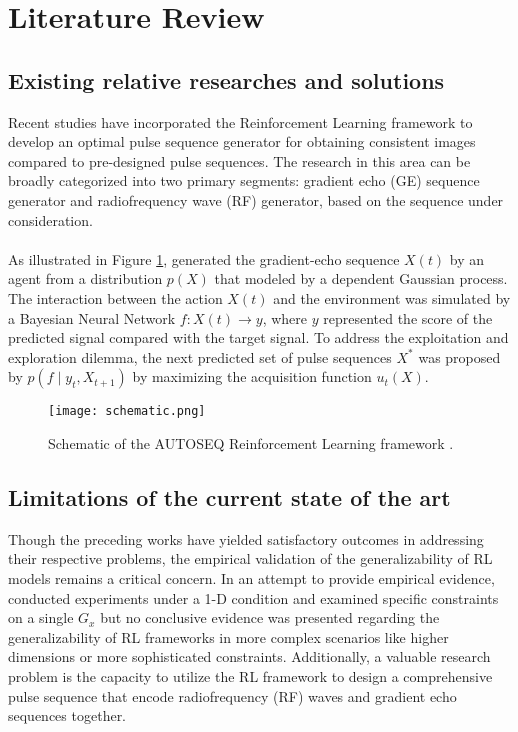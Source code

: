 \section{Literature Review}
\subsection{Existing relative researches and solutions}
Recent studies have incorporated the Reinforcement Learning framework to develop an optimal pulse sequence generator for obtaining consistent images compared to pre-designed pulse sequences. The research in this area can be broadly categorized into two primary segments: gradient echo (GE) sequence generator and radiofrequency wave (RF) generator, based on the sequence under consideration.
\\\\
As illustrated in Figure \ref{schematic}, \citet{0438} generated the gradient-echo sequence $X(t)$ by an agent from a distribution $p(X)$ that modeled by a dependent Gaussian process. The interaction between the action $X(t)$ and the environment was simulated by a Bayesian Neural Network $f:X(t) \rightarrow y$, where $y$ represented the score of the predicted signal compared with the target signal. To address the exploitation and exploration dilemma, the next predicted set of pulse sequences $X^*$ was proposed by $p\left(f \mid y_t, X_{t+1}\right)$ by maximizing the acquisition function $u_t(X)$.

\begin{figure}[ht]
    \centering
    \texttt{[image: schematic.png]}
    \caption{Schematic of the AUTOSEQ Reinforcement Learning framework \citep{0438}.}
    \label{schematic}
\end{figure}

\subsection{Limitations of the current state of the art}
Though the preceding works have yielded satisfactory outcomes in addressing their respective problems, the empirical validation of the generalizability of RL models remains a critical concern. In an attempt to provide empirical evidence, \citet{0438} conducted experiments under a 1-D condition and examined specific constraints on a single $G_x$ but no conclusive evidence was presented regarding the generalizability of RL frameworks in more complex scenarios like higher dimensions or more sophisticated constraints. Additionally, a valuable research problem is the capacity to utilize the RL framework to design a comprehensive pulse sequence that encode radiofrequency (RF) waves and gradient echo sequences together.
